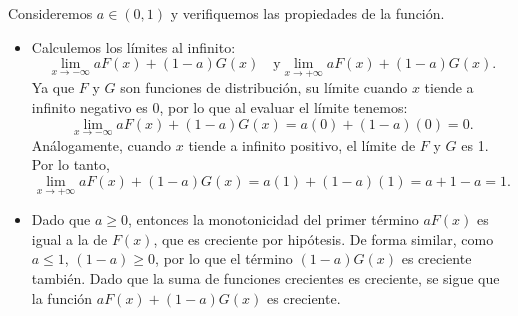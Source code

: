 \documentclass{article}
\begin{document}
\begin{enumerate}
\begin{enumerate}[label={(\roman*)}]
        Consideremos \(a \in (0, 1)\) y verifiquemos las propiedades de la función.
        \begin{itemize}
            \item Calculemos los límites al infinito: 
            \[
            \lim_{x \to -\infty} aF(x) + (1 - a)G(x) \quad \text{y} \lim_{x \to +\infty} aF(x) + (1 - a)G(x).
            \]
            Ya que \(F\) y \(G\) son funciones de distribución, su límite cuando \(x\) tiende a infinito negativo es 0, por lo que al evaluar el límite tenemos:
            \[
            \lim_{x \to -\infty} aF(x) + (1 - a)G(x) = a(0) + (1 - a)(0) = 0.
            \]
            Análogamente, cuando \(x\) tiende a infinito positivo, el límite de \(F\) y \(G\) es 1. Por lo tanto,
            \[
            \lim_{x \to +\infty} aF(x) + (1 - a)G(x) = a(1) + (1 - a)(1) = a + 1 - a = 1.
            \]
            \item Dado que \(a \geq 0\), entonces la monotonicidad del primer término \(aF(x)\) es igual a la de \(F(x)\), que es creciente por hipótesis. De forma similar, como \(a \leq 1\), \((1 - a) \geq 0\), por lo que el término \((1 - a)G(x)\) es creciente también. Dado que la suma de funciones crecientes es creciente, se sigue que la función \(aF(x) + (1 - a)G(x)\) es creciente.
        \end{itemize}
    \end{enumerate}
\end{enumerate}
\end{document}
